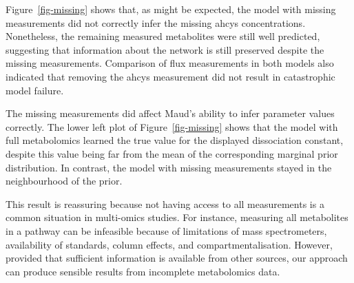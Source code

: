 \documentclass[journal=,manuscript=]{achemso}
\begin{document}
Figure~\ref{fig-missing} shows that, as might be expected, the model
with missing measurements did not correctly infer the missing ahcys
concentrations. Nonetheless, the remaining measured metabolites were
still well predicted, suggesting that information about the network is
still preserved despite the missing measurements. Comparison of flux
measurements in both models also indicated that removing the ahcys
measurement did not result in catastrophic model failure.

The missing measurements did affect Maud's ability to infer parameter
values correctly. The lower left plot of Figure~\ref{fig-missing} shows
that the model with full metabolomics learned the true value for the
displayed dissociation constant, despite this value being far from the
mean of the corresponding marginal prior distribution. In contrast, the
model with missing measurements stayed in the neighbourhood of the
prior.

This result is reassuring because not having access to all measurements
is a common situation in multi-omics studies. For instance, measuring
all metabolites in a pathway can be infeasible because of limitations of
mass spectrometers, availability of standards, column effects, and
compartmentalisation. However, provided that sufficient information is
available from other sources, our approach can produce sensible results
from incomplete metabolomics data.
\end{document}
